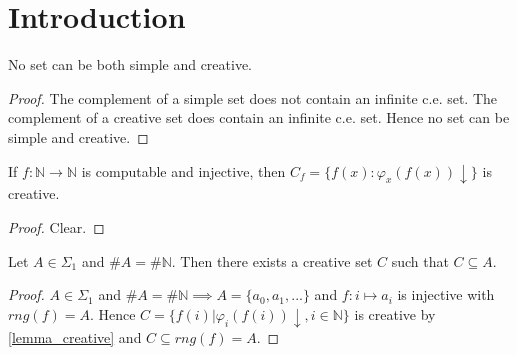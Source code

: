 \chapter{Introduction}

\begin{proposition}
No set can be both simple and creative.
\end{proposition}

\begin{proof}
The complement of a simple set does not contain an infinite c.e. set. The complement of a creative set does contain an infinite c.e. set. Hence no set can be simple and creative.
\end{proof}

\begin{lemma}\label{lemma_creative}
If $f : \mathbb{N} \to \mathbb{N}$ is computable and injective, then $C_f = \{f(x) : \varphi_x(f(x))\downarrow \}$ is creative.
\end{lemma}
\begin{proof}
Clear.
\end{proof}

\begin{proposition}
Let $A \in \Sigma_1$ and $\#A = \#\mathbb{N}$. Then there exists a creative set $C$ such that $C \subseteq A$.
\end{proposition}

\begin{proof}
$A \in \Sigma_1$ and $\#A = \#\mathbb{N} \implies A=\{a_0, a_1, ... \}$ and $f:i \mapsto a_i$ is injective with $rng(f)=A$. 
Hence $C=\{f(i) | \varphi_i(f(i))\downarrow, i \in \mathbb{N}\}$ is creative by \autoref{lemma_creative} and $C \subseteq	 rng(f) = A$.
\end{proof}



